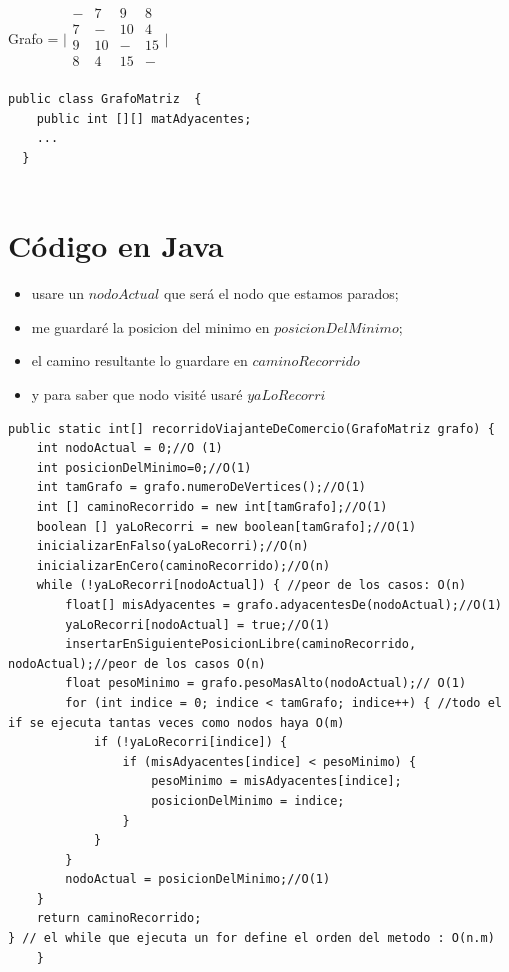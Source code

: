 \documentclass[a4paper,11pt]{article}
\begin{document}
Grafo = $\bigl|\begin{smallmatrix}-&7&9&8\\ 7&-&10&4 \\9&10&-&15 \\8&4&15&- \\\end{smallmatrix}\bigr|$
\begin{lstlisting}
public class GrafoMatriz  {
    public int [][] matAdyacentes;
    ...
  }
      
\end{lstlisting}
\section*{Código en Java}
\begin{itemize}
  \item usare un $nodoActual$ que será el nodo que estamos parados;
  \item  me guardaré la posicion del minimo en $posicionDelMinimo$;
  \item el camino resultante lo guardare en $ caminoRecorrido$
  \item  y para saber que nodo visité usaré $yaLoRecorri$
\end{itemize}

 \lstset{language=Java, breaklines=true, basicstyle=\footnotesize}
\begin{lstlisting}[frame=single]
public static int[] recorridoViajanteDeComercio(GrafoMatriz grafo) {
	int nodoActual = 0;//O (1)
	int posicionDelMinimo=0;//O(1)
	int tamGrafo = grafo.numeroDeVertices();//O(1)
	int [] caminoRecorrido = new int[tamGrafo];//O(1)
	boolean [] yaLoRecorri = new boolean[tamGrafo];//O(1)
	inicializarEnFalso(yaLoRecorri);//O(n)
	inicializarEnCero(caminoRecorrido);//O(n)
	while (!yaLoRecorri[nodoActual]) { //peor de los casos: O(n)
		float[] misAdyacentes = grafo.adyacentesDe(nodoActual);//O(1)
		yaLoRecorri[nodoActual] = true;//O(1)
		insertarEnSiguientePosicionLibre(caminoRecorrido, nodoActual);//peor de los casos O(n)
		float pesoMinimo = grafo.pesoMasAlto(nodoActual);// O(1)
		for (int indice = 0; indice < tamGrafo; indice++) { //todo el if se ejecuta tantas veces como nodos haya O(m)
			if (!yaLoRecorri[indice]) {
				if (misAdyacentes[indice] < pesoMinimo) {
					pesoMinimo = misAdyacentes[indice];
					posicionDelMinimo = indice;
				}
			}
		}
		nodoActual = posicionDelMinimo;//O(1)
	}
	return caminoRecorrido;
} // el while que ejecuta un for define el orden del metodo : O(n.m)
    }
\end{lstlisting}
\end{document}

